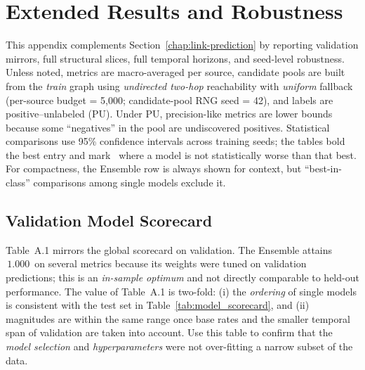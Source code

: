 \chapter{Extended Results and Robustness}
\label{app:extended-results}

This appendix complements Section~\ref{chap:link-prediction} by reporting validation mirrors, full structural slices, full temporal horizons, and seed-level robustness.
Unless noted, metrics are macro-averaged per source, candidate pools are built from the \textit{train} graph using \emph{undirected two-hop} reachability with \emph{uniform} fallback (per-source budget = 5{,}000; candidate-pool RNG seed = 42), and labels are positive--unlabeled (PU).
Under PU, precision-like metrics are lower bounds because some ``negatives'' in the pool are undiscovered positives.
Statistical comparisons use 95\% confidence intervals across training seeds; the tables bold the best entry and mark \textdagger\ where a model is not statistically worse than that best.
For compactness, the Ensemble row is always shown for context, but ``best-in-class'' comparisons among single models exclude it.

\section{Validation Model Scorecard}
\label{app:a1-scorecard}
\noindent
Table~A.1 mirrors the global scorecard on validation.
The Ensemble attains \(\,1.000\,\) on several metrics because its weights were tuned on validation predictions; this is an \emph{in-sample optimum} and not directly comparable to held-out performance.
The value of Table~A.1 is two-fold: (i) the \emph{ordering} of single models is consistent with the test set in Table~\ref{tab:model_scorecard}, and (ii) magnitudes are within the same range once base rates and the smaller temporal span of validation are taken into account.
Use this table to confirm that the \emph{model selection} and \emph{hyperparameters} were not over-fitting a narrow subset of the data.

